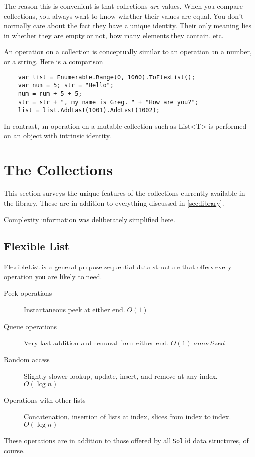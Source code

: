 \documentclass[]{article}
\newcommand{\solid}{\texttt{Solid}\xspace}
\begin{document}
The reason this is convenient is that collections \emph{are} values. When you compare collections, you always want to know whether their values are equal. You don't normally care about the fact they have a unique identity. Their only meaning lies in whether they are empty or not, how many elements they contain, etc.

An operation on a collection is conceptually similar to an operation on a number, or a string. Here is a comparison

\begin{lstlisting}
	var list = Enumerable.Range(0, 1000).ToFlexList();
	var num = 5; str = "Hello";
	num = num + 5 + 5; 
	str = str + ", my name is Greg. " + "How are you?";
	list = list.AddLast(1001).AddLast(1002);
\end{lstlisting}

In contrast, an operation on a mutable collection such as List<T> is performed on an object with intrinsic identity.

\section{The Collections}\label{sec:collections}
This section surveys the unique features of the collections currently available in the library. These are in addition to everything discussed in \cref{sec:library}.

Complexity information was deliberately simplified here.
\subsection{Flexible List}\label{sec:xlist}
FlexibleList is a general purpose sequential data structure that offers every operation you are likely to need. 
\begin{description}
	\item[Peek operations] Instantaneous peek at either end. $O(1)$
	\item[Queue operations] Very fast addition and removal from either end. $O(1)\; amortized$
	\item[Random access] Slightly slower lookup, update, insert, and remove at any index. $O(\log n)$
	\item[Operations with other lists] Concatenation, insertion of lists at index, slices from index to index. $O(\log n)$
\end{description}

These operations are in addition to those offered by all \solid data structures, of course. 
\end{document}
